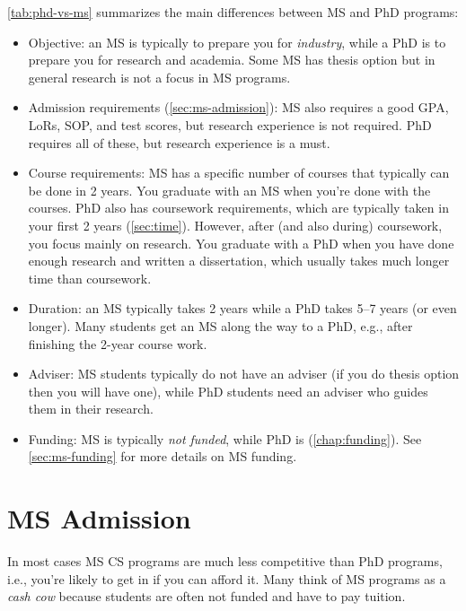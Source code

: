 \documentclass[oneside,11pt,dvipsnames]{book}
\begin{document}
\autoref{tab:phd-vs-ms} summarizes the main differences between MS and PhD programs:
\begin{itemize}

  \item Objective: an MS is typically to prepare you for \emph{industry}, while a PhD is to prepare you for research and academia. Some MS has thesis option but in general research is not a focus in MS programs.

  \item Admission requirements (\autoref{sec:ms-admission}): MS also requires a good GPA, LoRs, SOP, and test scores, but research experience is not required.  PhD requires all of these, but research experience is a must.
  
  \item Course requirements: MS has a specific number of courses that typically can be done in 2 years. You graduate with an MS when you're done with the courses. PhD also has coursework requirements, which are typically taken in your first 2 years  (\autoref{sec:time}). However, after (and also during) coursework, you focus mainly on research.  You graduate with a PhD when you have done enough research and written a dissertation, which usually takes much longer time than coursework.
  
  \item Duration: an MS typically takes 2 years while a PhD takes 5--7 years (or even longer).  Many students get an MS along the way to a PhD, e.g., after finishing the 2-year course work.
  
  \item Adviser: MS students typically do not have an adviser (if you do thesis option then you will have one), while PhD students need an adviser who guides them in their research.
  
  \item Funding: MS is typically \emph{not funded}, while PhD is (\autoref{chap:funding}). See \autoref{sec:ms-funding} for more details on MS funding.
  
\end{itemize}

\section{MS Admission}\label{sec:ms-admission}

In most cases MS CS programs are much less competitive than PhD programs, i.e., you're likely to get in if you can afford it. Many think of MS programs as a \emph{cash cow} because students are often not funded and have to pay tuition. 
\end{document}

